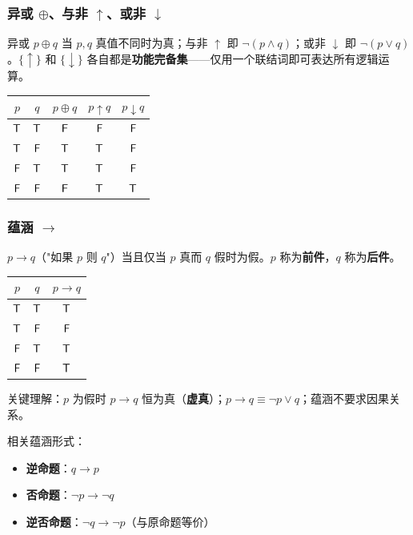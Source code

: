\subsubsection{异或 $\oplus$、与非 $\uparrow$、或非 $\downarrow$}

异或 $p \oplus q$ 当 $p,q$ 真值不同时为真；与非 $\uparrow$ 即 $\neg(p \land q)$；或非 $\downarrow$ 即 $\neg(p \lor q)$。$\{\uparrow\}$ 和 $\{\downarrow\}$ 各自都是\textbf{功能完备集}——仅用一个联结词即可表达所有逻辑运算。

\begin{center}
\begin{tabular}{cc|c|c|c}
\toprule
$p$ & $q$ & $p \oplus q$ & $p \uparrow q$ & $p \downarrow q$ \\
\midrule
$\mathsf{T}$ & $\mathsf{T}$ & $\mathsf{F}$ & $\mathsf{F}$ & $\mathsf{F}$ \\
$\mathsf{T}$ & $\mathsf{F}$ & $\mathsf{T}$ & $\mathsf{T}$ & $\mathsf{F}$ \\
$\mathsf{F}$ & $\mathsf{T}$ & $\mathsf{T}$ & $\mathsf{T}$ & $\mathsf{F}$ \\
$\mathsf{F}$ & $\mathsf{F}$ & $\mathsf{F}$ & $\mathsf{T}$ & $\mathsf{T}$ \\
\bottomrule
\end{tabular}
\end{center}

\subsubsection{蕴涵 $\rightarrow$}

$p \rightarrow q$（"如果 $p$ 则 $q$"）当且仅当 $p$ 真而 $q$ 假时为假。$p$ 称为\textbf{前件}，$q$ 称为\textbf{后件}。

\begin{center}
\begin{tabular}{cc|c}
\toprule
$p$ & $q$ & $p \rightarrow q$ \\
\midrule
$\mathsf{T}$ & $\mathsf{T}$ & $\mathsf{T}$ \\
$\mathsf{T}$ & $\mathsf{F}$ & $\mathsf{F}$ \\
$\mathsf{F}$ & $\mathsf{T}$ & $\mathsf{T}$ \\
$\mathsf{F}$ & $\mathsf{F}$ & $\mathsf{T}$ \\
\bottomrule
\end{tabular}
\end{center}

关键理解：$p$ 为假时 $p \rightarrow q$ 恒为真（\textbf{虚真}）；$p \rightarrow q \equiv \neg p \lor q$；蕴涵不要求因果关系。

相关蕴涵形式：
\begin{itemize}
\item \textbf{逆命题}：$q \rightarrow p$
\item \textbf{否命题}：$\neg p \rightarrow \neg q$
\item \textbf{逆否命题}：$\neg q \rightarrow \neg p$（与原命题等价）
\end{itemize}

